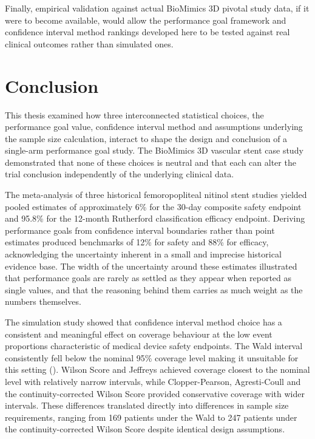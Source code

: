 \documentclass{article}
\begin{document}
Finally, empirical validation against actual BioMimics 3D pivotal study
data, if it were to become available, would allow the performance goal
framework and confidence interval method rankings developed here to be
tested against real clinical outcomes rather than simulated ones.

\newpage

\section*{Conclusion}\label{conclusion}

This thesis examined how three interconnected statistical choices, the
performance goal value, confidence interval method and assumptions
underlying the sample size calculation, interact to shape the design and
conclusion of a single-arm performance goal study. The BioMimics 3D
vascular stent case study demonstrated that none of these choices is
neutral and that each can alter the trial conclusion independently of
the underlying clinical data.

The meta-analysis of three historical femoropopliteal nitinol stent
studies yielded pooled estimates of approximately 6\% for the 30-day
composite safety endpoint and 95.8\% for the 12-month Rutherford
classification efficacy endpoint. Deriving performance goals from
confidence interval boundaries rather than point estimates produced
benchmarks of 12\% for safety and 88\% for efficacy, acknowledging the
uncertainty inherent in a small and imprecise historical evidence base.
The width of the uncertainty around these estimates illustrated that
performance goals are rarely as settled as they appear when reported as
single values, and that the reasoning behind them carries as much weight
as the numbers themselves.

The simulation study showed that confidence interval method choice has a
consistent and meaningful effect on coverage behaviour at the low event
proportions characteristic of medical device safety endpoints. The Wald
interval consistently fell below the nominal 95\% coverage level making
it unsuitable for this setting ().
Wilson Score and Jeffreys achieved coverage closest to the nominal level
with relatively narrow intervals, while Clopper-Pearson, Agresti-Coull
and the continuity-corrected Wilson Score provided conservative coverage
with wider intervals. These differences translated directly into
differences in sample size requirements, ranging from 169 patients under
the Wald to 247 patients under the continuity-corrected Wilson Score
despite identical design assumptions.
\end{document}
